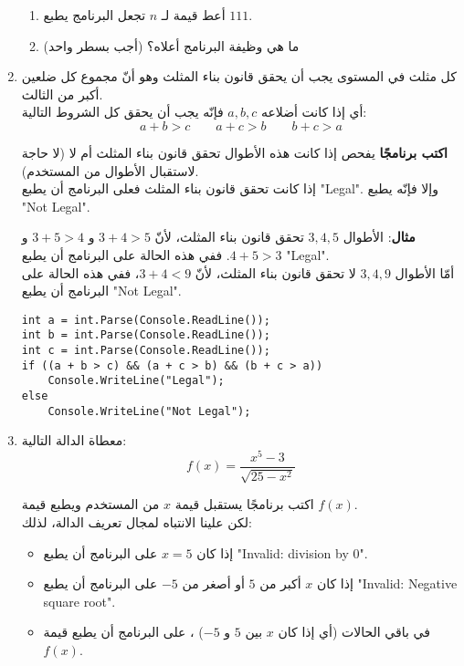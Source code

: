 \documentclass[12pt]{article}
\begin{document}
\begin{enumerate}[itemsep=2em]
\begin{enumerate}
\item
أعط قيمة لـ $n$ تجعل البرنامج يطبع $111$.

\item
ما هي وظيفة البرنامج أعلاه؟ (أجب بسطر واحد)
\end{enumerate}


\clearpage
\item
كل مثلث في المستوى يجب أن يحقق قانون بناء المثلث وهو أنّ مجموع كل ضلعين أكبر من الثالث. \\
 أي إذا كانت أضلاعه $a, b, c$ فإنّه يجب أن يحقق كل الشروط التالية:
\[ a + b > c  \qquad a + c > b  \qquad b + c > a \]

\textbf{اكتب برنامجًا} يفحص إذا كانت هذه الأطوال تحقق قانون بناء المثلث أم لا (لا حاجة لاستقبال الأطوال من المستخدم). \\
إذا كانت تحقق قانون بناء المثلث فعلى البرنامج أن يطبع \textenglish{"Legal"}.
وإلا فإنّه يطبع \textenglish{"Not Legal"}.

\textbf{مثال}: الأطوال $3, 4, 5$ تحقق قانون بناء المثلث، لأنّ $3 + 4 > 5$ و $3 + 5 > 4$ و $4 + 5 > 3$. ففي هذه الحالة على البرنامج أن يطبع \textenglish{"Legal"}. \\
أمّا الأطوال $3, 4, 9$ لا تحقق قانون بناء المثلث، لأنّ $3 + 4 < 9$، ففي هذه الحالة على البرنامج أن يطبع \textenglish{"Not Legal"}.

\ifwithsols
\begin{boxSolution}
\begin{english}
\begin{verbatim}
int a = int.Parse(Console.ReadLine());
int b = int.Parse(Console.ReadLine());
int c = int.Parse(Console.ReadLine());
if ((a + b > c) && (a + c > b) && (b + c > a))
    Console.WriteLine("Legal");
else
    Console.WriteLine("Not Legal");
\end{verbatim}
\end{english}
\end{boxSolution}
\fi

\item
معطاة الدالة التالية:
\[ f(x) = \frac{x^5 - 3}{\sqrt{25 - x^2}} \]

اكتب برنامجًا يستقبل قيمة $x$ من المستخدم ويطبع قيمة $f(x)$. \\
لكن علينا الانتباه لمجال تعريف الدالة، لذلك:
\begin{itemize}
    \item إذا كان $x = 5$ على البرنامج أن يطبع \textenglish{"Invalid: division by 0"}.
    \item إذا كان $x$ أكبر من $5$ أو أصغر من $-5$ على البرنامج أن يطبع \textenglish{"Invalid: Negative square root"}.
    \item في باقي الحالات (أي إذا كان $x$ بين $5$ و $-5$) ، على البرنامج أن يطبع قيمة $f(x)$.
\end{itemize}


\end{enumerate}
\end{document}
